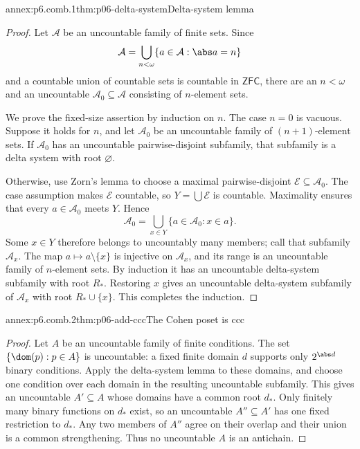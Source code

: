 
\begin{annexitem}{annex:p6.comb.1}{thm:p06-delta-system}{Delta-system lemma}
\begin{proof}
Let \(\mathcal A\) be an uncountable family of finite sets.  Since
\[
  \mathcal A=\bigcup_{n<\omega}
  \{a\in\mathcal A:\abs a=n\}
\]
and a countable union of countable sets is countable in \(\mathsf{ZFC}\),
there are an \(n<\omega\) and an uncountable
\(\mathcal A_0\subseteq\mathcal A\) consisting of \(n\)-element sets.

We prove the fixed-size assertion by induction on \(n\).  The case \(n=0\)
is vacuous.  Suppose it holds for \(n\), and let \(\mathcal A_0\) be an
uncountable family of \((n+1)\)-element sets.  If \(\mathcal A_0\) has an
uncountable pairwise-disjoint subfamily, that subfamily is a
delta system with root \(\varnothing\).

Otherwise, use Zorn's lemma to choose a maximal pairwise-disjoint
\(\mathcal E\subseteq\mathcal A_0\).  The case assumption makes
\(\mathcal E\) countable, so \(Y=\bigcup\mathcal E\) is countable.
Maximality ensures that every \(a\in\mathcal A_0\) meets \(Y\).  Hence
\[
  \mathcal A_0=
  \bigcup_{x\in Y}\{a\in\mathcal A_0:x\in a\}.
\]
Some \(x\in Y\) therefore belongs to uncountably many members; call that
subfamily \(\mathcal A_x\).  The map
\(a\mapsto a\setminus\{x\}\) is injective on \(\mathcal A_x\), and its
range is an uncountable family of \(n\)-element sets.  By induction it has an
uncountable delta-system subfamily with root \(R_\ast\).  Restoring \(x\)
gives an uncountable delta-system subfamily of \(\mathcal A_x\) with root
\(R_\ast\cup\{x\}\).  This completes the induction.
\end{proof}
\end{annexitem}

\begin{annexitem}{annex:p6.comb.2}{thm:p06-add-ccc}{The Cohen poset is ccc}
\begin{proof}
Let \(A\) be an uncountable family of finite conditions.  The
set \(\{\dom(p):p\in A\}\) is uncountable: a fixed finite domain \(d\)
supports only \(2^{\abs d}\) binary conditions.  Apply the delta-system
lemma to these domains, and choose one condition over each domain in the
resulting uncountable subfamily.  This gives an uncountable
\(A'\subseteq A\) whose domains have a common root \(d_\ast\).  Only finitely
many binary functions on \(d_\ast\) exist, so an uncountable
\(A''\subseteq A'\) has one fixed restriction to \(d_\ast\).  Any two members
of \(A''\) agree on their overlap and their union is
a common strengthening.  Thus no uncountable \(A\) is an antichain.
\end{proof}
\end{annexitem}
